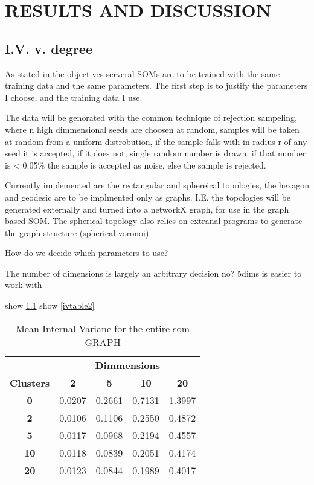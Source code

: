 \chapter{RESULTS AND DISCUSSION}



\section{I.V. v. degree}

As stated in the objectives serveral SOMs are to be trained with the same
training data and the same parameters.  The first step is to justify the
parameters I choose, and the training data I use.

The data will be genorated with the common technique of rejection sampeling,
where n high dimmensional seeds are choosen at random, samples will be taken
at random from a uniform distrobution, if the sample falls with in radius r of
any seed it is accepted, if it does not, single random number is drawn, if that
number is < 0.05\% the sample is accepted as noise, else the sample is rejected.

Currently implemented are the rectangular and sphereical topologies, the hexagon
and geodesic are to be implmented only as graphs.  I.E. the topologies will be
generated externally and turned into a networkX graph, for use in the graph
based SOM. The spherical topology also relies on extranal programs to generate
the graph structure (spherical voronoi).

How do we decide which parameters to use?

The number of dimensions is largely an arbitrary decision no?
5dims is easier to work with

show \ref{ivtable1}
show \ref{ivtable2}

\begin{table}
\caption{Mean Internal Variane for the entire som GRAPH}
\label{ivtable1}
\begin{tabular}{|c||c|c|c|c|}
\hline
&\multicolumn{4}{c|}{\textbf{Dimmensions}}\\
\textbf{Clusters} & \multicolumn{1}{c}{\textbf{2}} &
\multicolumn{1}{c}{\textbf{5}} & \multicolumn{1}{c}{\textbf{10}} &
\multicolumn{1}{c|}{\textbf{20}}\\
\hline
\hline
\textbf{0} & 0.0207& 0.2661& 0.7131& 1.3997 \\
\hline
\textbf{2} & 0.0106& 0.1106& 0.2550& 0.4872 \\
\hline
\textbf{5} & 0.0117& 0.0968& 0.2194& 0.4557 \\
\hline
\textbf{10} & 0.0118& 0.0839& 0.2051& 0.4174 \\
\hline
\textbf{20} & 0.0123& 0.0844& 0.1989& 0.4017 \\
\hline
\end{tabular} \end{table}



